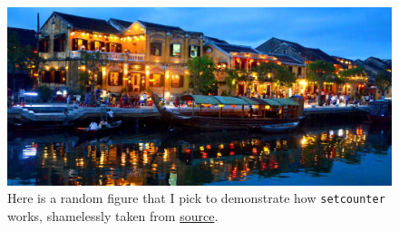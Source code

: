 \begin{figure}[ht!]
    \centering
    \includegraphics[scale=0.3]{graphics/Hoi-AN.jpeg}
    \caption{Here is a random figure that I pick to demonstrate how \texttt{setcounter} works, shamelessly taken from \href{https://www.ttrweekly.com/site/2019/07/hoi-an-reaps-top-accolade/}{source}.}
    \label{fig:appendix}
\end{figure}

